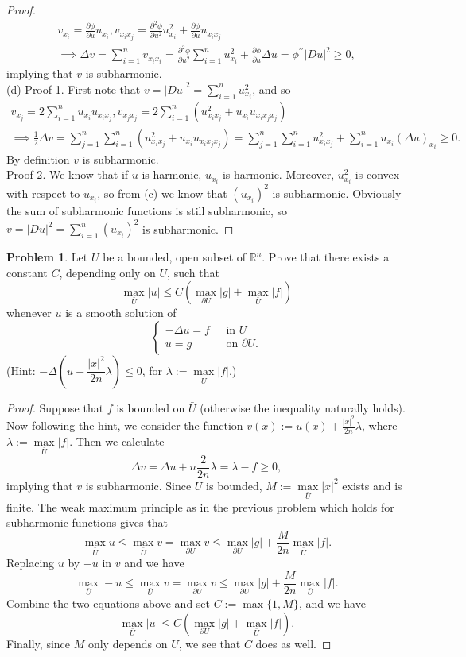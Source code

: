 \documentclass[hyperref,UTF8,12pt]{article}
\numberwithin{equation}{subsection}
\theoremstyle{plain}
\theoremstyle{definition}
\newtheorem{problem}{Problem}
\numberwithin{theorem}{section}
\numberwithin{lemma}{section}
\numberwithin{proposition}{section}
\numberwithin{remark}{section}
\numberwithin{corollary}{section}
\numberwithin{definition}{section}
\numberwithin{problem}{section}
\numberwithin{example}{section}
\newcommand{\dis}{\displaystyle}
\newcommand{\ptl}{\partial}
\newcommand{\mr}{\mathbb{R}}
\renewcommand{\leq}{\leqslant}
\renewcommand{\geq}{\geqslant}
\begin{document}
\begin{proof}
\[\begin{gathered}
	v_{x_i}=\frac{\ptl\phi}{\ptl u}u_{x_i},v_{x_ix_j}=\frac{\ptl^2\phi} {\ptl u^2}u^2_{x_i}+\frac{\ptl\phi}{\ptl u}u_{x_ix_j}\\ \implies\Delta
	v=\sum_{i=1}^nv_{x_ix_i}=\frac{\ptl^2\phi}{\ptl u^2}\sum_{i=1}^nu^2 _{x_i}+\frac{\ptl\phi}{\ptl u}\Delta u= \phi^{\prime\prime}|Du|^2\geq0,
\end{gathered}\]implying that $v$ is subharmonic.\\[4pt]
(d) \textsf{Proof 1}. First note that $v=|Du|^2=\dis\sum_{i=1}^nu_{x_i}^2$, and so \[\begin{gathered}
	v_{x_j}=2\sum_{i=1}^nu_{x_i}u_{x_ix_j},v_{x_jx_j}=2\sum_{i=1}^n(u^2_{x_ix_j}+u_{x_i}u_{x_ix_jx_j})\\ \implies\frac{1}{2}\Delta
	v=\sum_{j=1}^n\sum_{i=1}^n(u^2_{x_ix_j}+u_{x_i}u_{x_ix_jx_j})=\sum_{j=1}^n\sum_{i=1}^nu^2_{x_ix_j}+\sum_{i=1}^nu_{x_i}(\Delta u)_{x_i}\geq0.
\end{gathered}\]By definition $v$ is subharmonic.\\[4pt]
\textsf{Proof 2}. We know that if $u$ is harmonic, $u_{x_i}$ is harmonic. Moreover, $u^2_{x_i}$ is convex with respect to $u_{x_i}$, so from (c) we know that $(u_{x_i})^2$ is subharmonic. Obviously the sum of subharmonic functions is still subharmonic, so $v=|Du|^2=\dis\sum_{i=1}^n(u_{x_i})^2$ is subharmonic.
\end{proof}
\begin{problem}
Let $U$ be a bounded, open subset of $\mr^n$. Prove that there exists a constant $C$, depending only on $U$, such that
\[\max_{\bar{U}}|u|\leq C(\max_{\ptl U}|g|+\max_{\bar{U}}|f|)\]
whenever $u$ is a smooth solution of\[\left\{\begin{aligned}
	-\Delta u=f &\text{~ in }U\\
	u=g &\text{~ on }\partial U .
\end{aligned}\right.\]
(Hint: $-\Delta(u+\dfrac{|x|^2}{2n}\lambda)\leq0$, for $\lambda:=\max\limits_{\bar{U}}|f|.$)
\end{problem}
\begin{proof}
Suppose that $f$ is bounded on $\bar{U}$ (otherwise the inequality naturally holds). Now following the hint, we consider the function $v(x):=u(x)+\frac{|x|^2}{2n}\lambda$, where $\lambda:=\max\limits _{\bar{U}}|f|$. Then we calculate \[\Delta v=\Delta u+n\frac{2}{2n}\lambda=\lambda-f\geq0,\]implying that $v$ is subharmonic. Since $U$ is bounded, $M:=\max\limits_{\bar{U}}|x|^2$ exists and is finite. The weak maximum principle as in the previous problem which holds for subharmonic functions gives that
\[\max_{\bar{U}}u\leq\max_{\bar{U}}v=\max_{\partial U}v\leq\max_{\ptl U}|g|+ \frac{M}{2n}\max_{\bar{U}}|f|.\]Replacing $u$ by $-u$ in $v$ and we have \[\max_{\bar{U}}-u\leq\max_{\bar{U}}v=\max_{\ptl U}v\leq\max_{\ptl U}|g|+ \frac{M}{2n}\max_{\bar{U}}|f|.\] Combine the two equations above and set $C:=\max\{1, M\}$, and we have\[\max_{\bar{U}}|u|\leq C(\max_{\ptl U}|g|+\max_{\bar{U}}|f|).\] Finally, since $M$ only depends on $U$, we see that $C$ does as well.
\end{proof}
\end{document}
